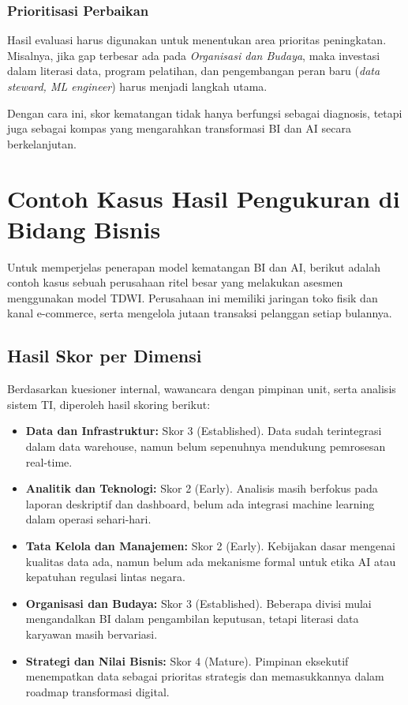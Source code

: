 \subsubsection*{Prioritisasi Perbaikan}
Hasil evaluasi harus digunakan untuk menentukan area prioritas peningkatan.  
Misalnya, jika gap terbesar ada pada \textit{Organisasi dan Budaya}, 
maka investasi dalam literasi data, program pelatihan, dan pengembangan peran baru 
(\textit{data steward, ML engineer}) harus menjadi langkah utama.  

Dengan cara ini, skor kematangan tidak hanya berfungsi sebagai diagnosis, 
tetapi juga sebagai kompas yang mengarahkan transformasi BI dan AI secara berkelanjutan.

\section{Contoh Kasus Hasil Pengukuran di Bidang Bisnis}

Untuk memperjelas penerapan model kematangan BI dan AI, berikut adalah contoh kasus 
sebuah perusahaan ritel besar yang melakukan asesmen menggunakan model TDWI. 
Perusahaan ini memiliki jaringan toko fisik dan kanal e-commerce, serta mengelola 
jutaan transaksi pelanggan setiap bulannya.

\subsection*{Hasil Skor per Dimensi}
Berdasarkan kuesioner internal, wawancara dengan pimpinan unit, serta analisis sistem TI, 
diperoleh hasil skoring berikut:
\begin{itemize}
	\item \textbf{Data dan Infrastruktur:} Skor 3 (Established).  
	Data sudah terintegrasi dalam data warehouse, namun belum sepenuhnya 
	mendukung pemrosesan real-time.
	\item \textbf{Analitik dan Teknologi:} Skor 2 (Early).  
	Analisis masih berfokus pada laporan deskriptif dan dashboard, 
	belum ada integrasi machine learning dalam operasi sehari-hari.
	\item \textbf{Tata Kelola dan Manajemen:} Skor 2 (Early).  
	Kebijakan dasar mengenai kualitas data ada, namun belum ada mekanisme formal 
	untuk etika AI atau kepatuhan regulasi lintas negara.
	\item \textbf{Organisasi dan Budaya:} Skor 3 (Established).  
	Beberapa divisi mulai mengandalkan BI dalam pengambilan keputusan, 
	tetapi literasi data karyawan masih bervariasi.
	\item \textbf{Strategi dan Nilai Bisnis:} Skor 4 (Mature).  
	Pimpinan eksekutif menempatkan data sebagai prioritas strategis 
	dan memasukkannya dalam roadmap transformasi digital.
\end{itemize}

